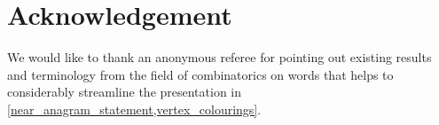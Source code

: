 \documentclass{patmorin}
\begin{document}
\section*{Acknowledgement}

We would like to thank an anonymous referee for pointing out existing results and terminology from the field of combinatorics on words that helps to considerably streamline the presentation in \cref{near_anagram_statement,vertex_colourings}.



\end{document}
